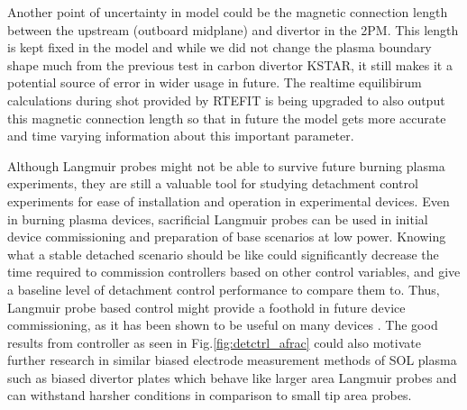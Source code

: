 Another point of uncertainty in \Afrac model could be the magnetic connection length between the upstream (outboard midplane) and divertor in the 2PM\cite{Leonard_2018_PPCF}. This length is kept fixed in the model and while we did not change the plasma boundary shape much from the previous test\cite{Eldon_2022_PPCF} in carbon divertor KSTAR, it still makes it a potential source of error in wider usage in future. The realtime equilibirum calculations during shot provided by RTEFIT is being upgraded to also output this magnetic connection length so that in future the model gets more accurate and time varying information about this important parameter.

Although Langmuir probes might not be able to survive future burning plasma experiments, they are still a valuable tool for studying detachment control experiments for ease of installation and operation in experimental devices.
Even in burning plasma devices, sacrificial Langmuir probes can be used in initial device commissioning and preparation of base scenarios at low power.
Knowing what a stable detached scenario should be like could significantly decrease the time required to commission controllers based on other control variables, and give a baseline level of detachment control performance to compare them to.
Thus, Langmuir probe based control might provide a foothold in future device commissioning, as it has been shown to be useful on many devices \cite{Eldon_2021_NME, Guillemaut_2017_PPCF, Yuan_2020_FED, Khodunov_2021_PPCF}.
The good results from \Afrac controller as seen in Fig.\ref{fig:detctrl_afrac} could also motivate further research in similar biased electrode measurement methods of SOL plasma such as biased divertor plates \cite{Toi_2023_NF, Cui_2024_NF} which behave like larger area Langmuir probes and can withstand harsher conditions in comparison to small tip area probes.

